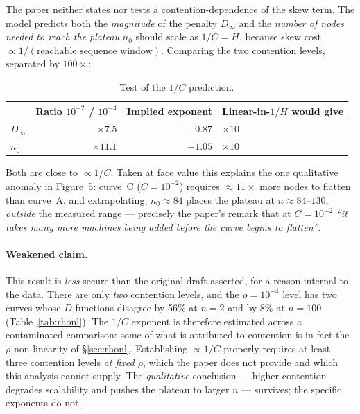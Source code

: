 \documentclass[11pt,a4paper]{article}
\newcommand{\hot}{C}
\begin{document}
The paper neither states nor tests a contention-dependence of the skew term.
The model predicts both the \emph{magnitude} of the penalty $D_\infty$ and the
\emph{number of nodes needed to reach the plateau} $n_0$ should scale as
$1/\hot = H$, because skew cost $\propto 1/(\text{reachable sequence window})$.
Comparing the two contention levels, separated by $100\times$:

\begin{table}[H]
\centering
\caption{Test of the $1/\hot$ prediction.}
\begin{tabular}{@{}lrrl@{}}
\toprule
& \textbf{Ratio $10^{-2}$ / $10^{-4}$} & \textbf{Implied exponent} &
\textbf{Linear-in-$1/H$ would give} \\
\midrule
$D_\infty$ & $\times 7.5$  & $+0.87$ & $\times 10$ \\
$n_0$      & $\times 11.1$ & $+1.05$ & $\times 10$ \\
\bottomrule
\end{tabular}
\end{table}

Both are close to $\propto 1/\hot$. Taken at face value this explains the one
qualitative anomaly in Figure~5: curve~C ($C=10^{-2}$) requires
$\approx11\times$ more nodes to flatten than curve~A, and extrapolating,
$n_0\approx84$ places the plateau at $n\approx84$--$130$, \emph{outside} the
measured range --- precisely the paper's remark that at $\hot{=}10^{-2}$
\emph{``it takes many more machines being added before the curve begins to
flatten''}.

\paragraph{\textbf{Weakened claim.}} This result is \emph{less} secure than
the original draft asserted, for a reason internal to the data. There are only
\emph{two} contention levels, and the $\rho{=}10^{-4}$ level has two curves
whose $D$ functions disagree by 56\% at $n{=}2$ and by 8\% at $n{=}100$
(Table~\ref{tab:rhonl}). The $1/C$ exponent is therefore estimated across a
contaminated comparison: some of what is attributed to contention is in fact
the $\rho$ non-linearity of \S\ref{sec:rhonl}. Establishing $\propto1/\hot$
properly requires at least three contention levels \emph{at fixed $\rho$}, which
the paper does not provide and which this analysis cannot supply. The
\emph{qualitative} conclusion --- higher contention degrades scalability and
pushes the plateau to larger $n$ --- survives; the specific exponents do not.
\end{document}
